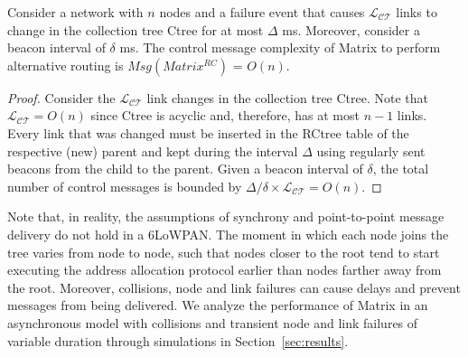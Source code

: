 \begin{theorem} Consider a network with $n$ nodes and a failure event that
causes $\mathcal{L_{CT}}$ links to change in the collection tree Ctree for at
most $\Delta$ ms.
Moreover, consider a beacon interval of $\delta$ ms.
The control message complexity of Matrix to perform
alternative routing is $Msg(Matrix^{RC})$ = $O(n)$.
\end{theorem}
\begin{proof}
Consider the $\mathcal{L_{CT}}$ link changes in the collection tree
Ctree. Note that $\mathcal{L_{CT}} = O(n)$ since Ctree is acyclic
and, therefore, has at most $n-1$ links. Every link that was changed
must be inserted in the RCtree table of the respective (new) parent
and kept during the interval $\Delta$ using regularly sent beacons
from the child to the parent. Given a beacon interval of $\delta$,
the total number of control messages is bounded by
${\Delta}/{\delta} \times \mathcal{L_{CT}} = O(n)$.
\end{proof}

Note that, in reality, the assumptions of synchrony and
point-to-point message delivery do not hold in a 6LoWPAN. The moment
in which each node joins the tree varies from node to node, such
that nodes closer to the root tend to start executing the address
allocation protocol earlier than nodes farther away from the root.
Moreover, collisions, node and link failures can cause delays and
prevent messages from being delivered. We analyze the performance of
Matrix in an asynchronous model with collisions and transient node
and link failures of variable duration through simulations in
Section~\ref{sec:results}.
